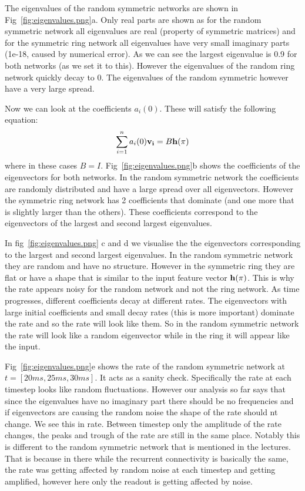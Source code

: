 \documentclass[a4paper, 11pt, oneside]{report}
\begin{document}
The eigenvalues of the random symmetric networks are shown in Fig~\ref{fig:eigenvalues.png}a.
Only real parts are shown as for the random symmetric network all eigenvalues are real (property of symmetric matrices)
and for the symmetric ring network all eigenvalues have very small imaginary parts (1e-18, caused by numerical error).
As we can see the largest eigenvalue is 0.9 for both networks (as we set it to this). However the eigenvalues
of the random ring network quickly decay to 0. The eigenvalues of the random symmetric however have a very large spread.

Now we can look at the coefficients $a_i(0)$. These will satisfy the following equation:
\begin{equation}
    \sum_{i=1}^n a_i(0) \mathbf{v_i} = B\mathbf{h}(\pi)
\end{equation}
where in these cases $B=I$. Fig~\ref{fig:eigenvalues.png}b shows the coefficients of the eigenvectors for both networks.
In the random symmetric network the coefficients are randomly distributed and have a large spread over all eigenvectors.
However the symmetric ring network has 2 coefficients that dominate (and one more that is slightly larger than the others).
These coefficients correspond to the eigenvectors of the largest and second largest eigenvalues.

In fig~\ref{fig:eigenvalues.png} c and d we visualise the the eigenvectors corresponding to the largest and second largest eigenvalues.
In the random symmetric network they are random and have no structure.
However in the symmetric ring they are flat or have a shape that is similar to the input feature vector $\mathbf{h}(\pi)$.
This is why the rate appears noisy for the random network and not the ring network. As time progresses, different coefficients
decay at different rates. The eigenvectors with large initial coefficients and small decay rates (this is more important) dominate the rate
and so the rate will look like them. So in the random symmetric network the rate will look like a random eigenvector
while in the ring it will appear like the input.

Fig~\ref{fig:eigenvalues.png}e shows the rate of the random symmetric network at $t=[20ms, 25ms, 30ms]$.
It acts as a sanity check. Specifically the rate at each timestep looks like random fluctuations.
However our analysis so far says that since the eigenvalues have no imaginary part there should be no frequencies
and if eigenvectors are causing the random noise the shape of the rate should nt change.
We see this in rate. Between timestep only the amplitude of the rate changes, the peaks and trough of the rate
are still in the same place. Notably this is different to the random symmetric network that is mentioned in the lectures.
That is because in there while the recurrent connectivity is basically the same, the rate was getting affected by random noise
at each timestep and getting amplified, however here only the readout is getting affected by noise.
\end{document}
